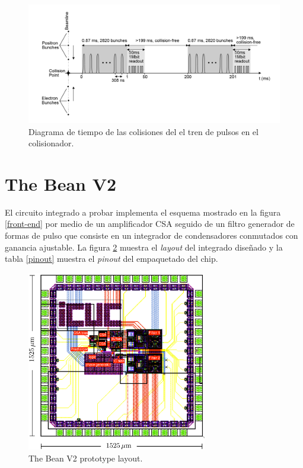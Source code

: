 \documentclass[11pt,letterpaper,spanish]{article}
\begin{document}
\begin{figure}[!t]
\centering
\includegraphics[width=1\textwidth]{./figuras/tiempo.png}
\caption{\label{requisitos de tiempo}Diagrama de tiempo de las colisiones del el tren de pulsos en el colisionador.}
\end{figure}


\section{The Bean V2}
El circuito integrado a probar implementa el esquema mostrado en la figura \ref{front-end} por medio de un amplificador CSA seguido de un filtro generador de formas de pulso que consiste en un integrador  de condensadores conmutados con ganancia ajustable. La figura \ref{layout} muestra el \textit{layout} del integrado diseñado y la tabla \ref{pinout} muestra el \textit{pinout} del empaquetado del chip. 

	
\begin{figure}[!t]
	\centering
	\includegraphics[width=0.7\textwidth]{./figuras/IC_layout}
	\caption{\label{layout}The Bean V2 prototype layout.}
\end{figure}
\end{document}
